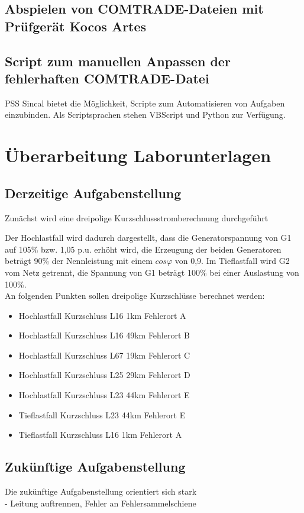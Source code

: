 \documentclass{scrartcl}
\begin{document}
\begin{onehalfspace}
\subsection{Abspielen von COMTRADE-Dateien mit Prüfgerät Kocos Artes}


\subsection{Script zum manuellen Anpassen der fehlerhaften COMTRADE-Datei}
PSS Sincal bietet die Möglichkeit, Scripte zum Automatisieren von Aufgaben einzubinden. Als Scriptsprachen stehen VBScript und Python zur Verfügung.

\section{Überarbeitung Laborunterlagen}


\subsection{Derzeitige Aufgabenstellung}
Zunächst wird eine dreipolige Kurzschlussstromberechnung durchgeführt

Der Hochlastfall wird dadurch dargestellt, dass die Generatorspannung von G1 auf 105\% bzw. 1,05 p.u. erhöht wird, die Erzeugung der beiden Generatoren beträgt 90\% der Nennleistung mit einem $cos \varphi $ von 0,9. Im Tieflastfall wird G2 vom Netz getrennt, die Spannung von G1 beträgt 100\% bei einer Auslastung von 100\%. \\
An folgenden Punkten sollen dreipolige Kurzschlüsse berechnet werden:
\begin{itemize}
\item Hochlastfall Kurzschluss L16 1km Fehlerort A
\item Hochlastfall Kurzschluss L16 49km Fehlerort B
\item Hochlastfall Kurzschluss L67 19km Fehlerort C
\item Hochlastfall Kurzschluss L25 29km Fehlerort D
\item Hochlastfall Kurzschluss L23 44km Fehlerort E
\item Tieflastfall Kurzschluss L23 44km Fehlerort E
\item Tieflastfall Kurzschluss L16 1km Fehlerort A
\end{itemize}




\subsection{Zukünftige Aufgabenstellung}
Die zukünftige Aufgabenstellung orientiert sich stark \\
- Leitung auftrennen, Fehler an \glqq Fehlersammelschiene\grqq

\end{onehalfspace}
\end{document}
